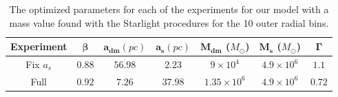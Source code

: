 \begin{table}[H]
\begin{center}
\begin{tabular}{| c| c| c| c| c| c| c|}
    \hline
    \textbf{Experiment} & $\mathbf{\beta}$ & $\mathbf{a_{dm}} (pc)$ & $\mathbf{a_{s}} (pc)$ & $\mathbf{M_{dm}}$ ($M_{\odot}$) & $\mathbf{M_{s}}$ ($M_{\odot}$) & $\mathbf{\Gamma}$\\ \hline
	Fix $a_s$ &	$0.88$ &	$56.98$ &	$2.23$ &	$9 \times 10^{4}$ &	$4.9 \times 10 ^{6}$ &	$1.1$\\ \hline
	Full &	$0.92$ &	$7.26$ &	$37.98$ &	$1.35 \times 10^{6}$ &	$4.9 \times 10^{6}$ &	$0.72$\\ \hline
  \end{tabular} 
\caption[Optimized parameters for our model with a mass value based on the Starlight procedures for the 10 outer radial bins.]{The optimized parameters for each of the experiments for our model with a mass value found with the Starlight procedures for the 10 outer radial bins.}
\end{center}  
\end{table}

